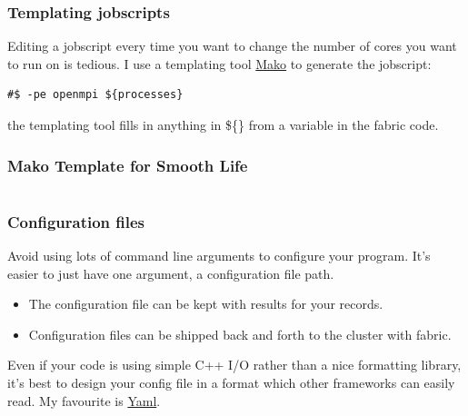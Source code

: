 \subsubsection{Templating jobscripts}\label{templating-jobscripts}

Editing a jobscript every time you want to change the number of cores
you want to run on is tedious. I use a templating tool
\href{http://www.makotemplates.org}{Mako} to generate the jobscript:

\begin{verbatim}
#$ -pe openmpi ${processes}
\end{verbatim}

the templating tool fills in anything in \$\{\} from a variable in the
fabric code.

\subsubsection{Mako Template for Smooth
Life}\label{mako-template-for-smooth-life}

\begin{verbatim}
\end{verbatim}

\subsubsection{Configuration files}\label{configuration-files}

Avoid using lots of command line arguments to configure your program.
It's easier to just have one argument, a configuration file path.

\begin{itemize}
\itemsep1pt\parskip0pt
\item
  The configuration file can be kept with results for your records.
\item
  Configuration files can be shipped back and forth to the cluster with
  fabric.
\end{itemize}

Even if your code is using simple C++ I/O rather than a nice formatting
library, it's best to design your config file in a format which other
frameworks can easily read. My favourite is
\href{http://www.yaml.org}{Yaml}.

\begin{Shaded}
\begin{Highlighting}[]
 
 
 
\end{Highlighting}
\end{Shaded}

